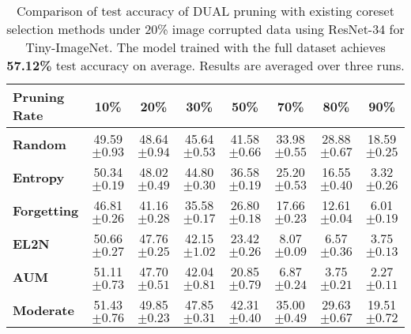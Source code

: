 \begin{table}[ht]
\caption{\label{tab:image_corruption_20_tinyimagenet}Comparison of test accuracy of DUAL pruning with existing coreset selection methods under 20\% image corrupted data using ResNet-34 for Tiny-ImageNet. The model trained with the full dataset achieves \textbf{57.12\%} test accuracy on average. Results are averaged over three runs.}
\setlength{\tabcolsep}{3.1pt}
\centering
\begin{tabular}{lccccccc}
    \toprule
    \textbf{Pruning Rate} & \textbf{10\%} & \textbf{20\%} & \textbf{30\%} & \textbf{50\%} & \textbf{70\%} & \textbf{80\%} & \textbf{90\%} \\
    \midrule
    \textbf{Random} & 49.59 \scriptsize{$ \pm 0.93 $} & 48.64 \scriptsize{$ \pm 0.94 $} & 45.64 \scriptsize{$ \pm 0.53 $} & 41.58 \scriptsize{$ \pm 0.66 $} & 33.98 \scriptsize{$ \pm 0.55 $} & 28.88 \scriptsize{$ \pm 0.67 $} & 18.59 \scriptsize{$ \pm 0.25 $} \\
    
    \textbf{Entropy} & 50.34 \scriptsize{$ \pm 0.19 $} & 48.02 \scriptsize{$ \pm 0.49 $} & 44.80 \scriptsize{$ \pm 0.30 $} & 36.58 \scriptsize{$ \pm 0.19 $} & 25.20 \scriptsize{$ \pm 0.53 $} & 16.55 \scriptsize{$ \pm 0.40 $} & 3.32 \scriptsize{$ \pm 0.26 $} \\
    
    \textbf{Forgetting} & 46.81 \scriptsize{$ \pm 0.26 $} & 41.16 \scriptsize{$ \pm 0.28 $} & 35.58 \scriptsize{$ \pm 0.17 $} & 26.80 \scriptsize{$ \pm 0.18 $} & 17.66 \scriptsize{$ \pm 0.23 $} & 12.61 \scriptsize{$ \pm 0.04 $} & 6.01 \scriptsize{$ \pm 0.19 $} \\
    
    \textbf{EL2N} & 50.66 \scriptsize{$ \pm 0.27 $} & 47.76 \scriptsize{$ \pm 0.25 $} & 42.15 \scriptsize{$ \pm 1.02 $} & 23.42 \scriptsize{$ \pm 0.26 $} & 8.07 \scriptsize{$ \pm 0.09 $} & 6.57 \scriptsize{$ \pm 0.36 $} & 3.75 \scriptsize{$ \pm 0.13 $} \\
    
    \textbf{AUM} &  51.11 \scriptsize{$ \pm 0.73 $} & 47.70 \scriptsize{$ \pm 0.51 $} & 42.04 \scriptsize{$ \pm 0.81 $} & 20.85 \scriptsize{$ \pm 0.79 $} & 6.87 \scriptsize{$ \pm 0.24 $} & 3.75 \scriptsize{$ \pm 0.21 $} & 2.27 \scriptsize{$ \pm 0.11 $} \\
    
    \textbf{Moderate} & 51.43 \scriptsize{$ \pm 0.76 $} & 49.85 \scriptsize{$ \pm 0.23 $} & 47.85 \scriptsize{$ \pm 0.31 $} & 42.31 \scriptsize{$ \pm 0.40 $} & 35.00 \scriptsize{$ \pm 0.49 $} & 29.63 \scriptsize{$ \pm 0.67 $} & 19.51 \scriptsize{$ \pm 0.72 $} \\
    

\end{tabular}
\end{table}
